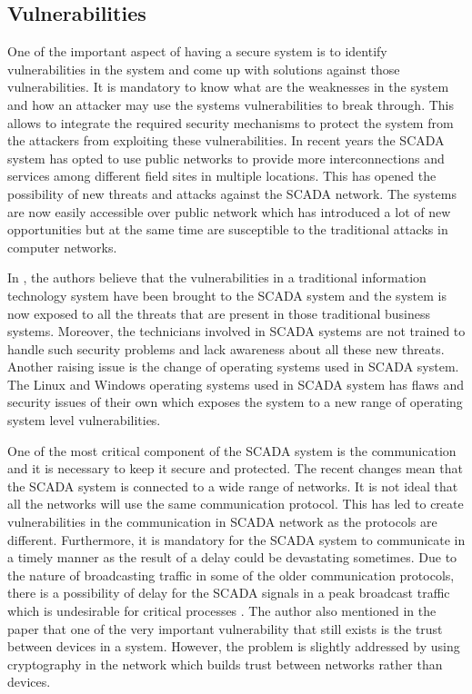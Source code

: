 \documentclass[letterpaper, 10 pt, conference]{ieeeconf}  %
\begin{document}
\subsection{Vulnerabilities}
One of the important aspect of having a secure system is to identify vulnerabilities in the system and come up with solutions against those vulnerabilities. It is mandatory to know what are the weaknesses in the system and how an attacker may use the systems vulnerabilities to break through. This allows to integrate the required security mechanisms to protect the system from the attackers from exploiting these vulnerabilities. 
In recent years the SCADA system has opted to use public networks to provide more interconnections and services among different field sites in multiple locations. This has opened the possibility of new threats and attacks against the SCADA network. The systems are now easily accessible over public network which has introduced a lot of new opportunities but at the same time are susceptible to the traditional attacks in computer networks.
\par
In \cite{c14}, the authors believe that the vulnerabilities in a traditional information technology system have been brought to the SCADA system and the system is now exposed to all the threats that are present in those traditional business systems. Moreover, the technicians involved in SCADA systems are not trained to handle such security problems and lack awareness about all these new threats. Another raising issue is the change of operating systems used in SCADA system. The Linux and Windows operating systems used in SCADA system has flaws and security issues of their own which exposes the system to a new range of operating system level vulnerabilities.
\par
One of the most critical component of the SCADA system is the communication and it is necessary to keep it secure and protected. The recent changes mean that the SCADA system is connected to a wide range of networks. It is not ideal that all the networks will use the same communication protocol. This has led to create vulnerabilities in the communication in SCADA network as the protocols are different. Furthermore, it is mandatory for the SCADA system to communicate in a timely manner as the result of a delay could be devastating sometimes. Due to the nature of broadcasting traffic in some of the older communication protocols, there is a possibility of delay for the SCADA signals in a peak broadcast traffic which is undesirable for critical processes \cite{c15}. The author also mentioned in the paper \cite{c15} that one of the very important vulnerability that still exists is the trust between devices in  a system. However, the problem is slightly addressed by using cryptography in the network which builds trust between networks rather than devices.
\end{document}

